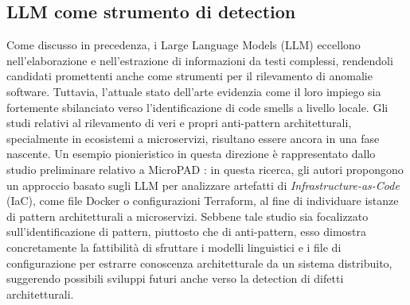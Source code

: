 \subsection{LLM come strumento di detection}
Come discusso in precedenza, i Large Language Models (LLM) eccellono nell'elaborazione e nell'estrazione di informazioni da testi complessi, rendendoli candidati promettenti anche come strumenti per il rilevamento di anomalie software. Tuttavia, l'attuale stato dell'arte evidenzia come il loro impiego sia fortemente sbilanciato verso l'identificazione di code smells a livello locale. Gli studi relativi al rilevamento di veri e propri anti-pattern architetturali, specialmente in ecosistemi a microservizi, risultano essere ancora in una fase nascente. Un esempio pionieristico in questa direzione è rappresentato dallo studio preliminare relativo a MicroPAD \cite{iac_llm}: in questa ricerca, gli autori propongono un approccio basato sugli LLM per analizzare artefatti di \textit{Infrastructure-as-Code} (IaC), come file Docker o configurazioni Terraform, al fine di individuare istanze di pattern architetturali a microservizi. Sebbene tale studio sia focalizzato sull'identificazione di pattern, piuttosto che di anti-pattern, esso dimostra concretamente la fattibilità di sfruttare i modelli linguistici e i file di configurazione per estrarre conoscenza architetturale da un sistema distribuito, suggerendo possibili sviluppi futuri anche verso la detection di difetti architetturali.


